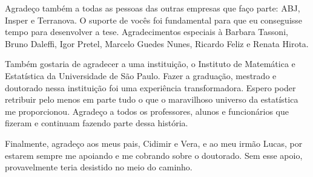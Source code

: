\documentclass[12pt,twoside,brazilian]{book}
\begin{document}
Agradeço também a todas as pessoas das outras empresas que faço parte: ABJ, Insper e Terranova. O suporte de vocês foi fundamental para que eu conseguisse tempo para desenvolver a tese. Agradecimentos especiais à Barbara Tassoni, Bruno Daleffi, Igor Pretel, Marcelo Guedes Nunes, Ricardo Feliz e Renata Hirota.

Também gostaria de agradecer a uma instituição, o Instituto de Matemática e Estatística da Universidade de São Paulo. Fazer a graduação, mestrado e doutorado nessa instituição foi uma experiência transformadora. Espero poder retribuir pelo menos em parte tudo o que o maravilhoso universo da estatística me proporcionou. Agradeço a todos os professores, alunos e funcionários que fizeram e continuam fazendo parte dessa história.

Finalmente, agradeço aos meus pais, Cidimir e Vera, e ao meu irmão Lucas, por estarem sempre me apoiando e me cobrando sobre o doutorado. Sem esse apoio, provavelmente teria desistido no meio do caminho.

% 




\end{document}
